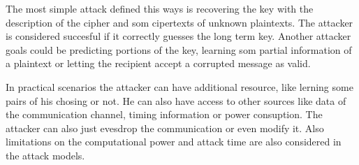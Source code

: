 The most simple attack defined this ways is recovering the key with the description of the cipher and som cipertexts of unknown plaintexts.
The attacker is considered succesful if it correctly guesses the long term key.
Another attacker goals could be predicting portions of the key, learning som partial information of a plaintext or letting the recipient accept a corrupted message as valid.

In practical scenarios the attacker can have additional resource, like lerning some pairs of his chosing or not.
He can also have access to other sources like data of the communication channel, timing information or power consuption.
The attacker can also just evesdrop the communication or even modify it.
Also limitations on the computational power and attack time are also considered in the attack models.

